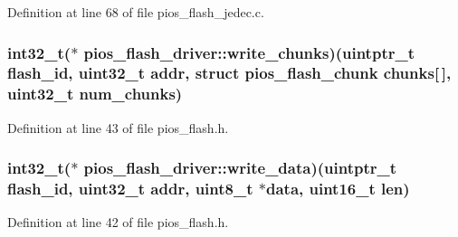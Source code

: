 \-Definition at line 68 of file pios\-\_\-flash\-\_\-jedec.\-c.

\hypertarget{group___p_i_o_s___f_l_a_s_h_ga5bac463e83aa46ce41c151c74ff8467b}{
\subsubsection[{write\-\_\-chunks}]{\setlength{\rightskip}{0pt plus 5cm}int32\-\_\-t($\ast$ {\bf pios\-\_\-flash\-\_\-driver\-::write\-\_\-chunks})(uintptr\-\_\-t flash\-\_\-id, uint32\-\_\-t addr, struct {\bf pios\-\_\-flash\-\_\-chunk} chunks\mbox{[}$\,$\mbox{]}, uint32\-\_\-t num\-\_\-chunks)}}\label{group___p_i_o_s___f_l_a_s_h_ga5bac463e83aa46ce41c151c74ff8467b}


\-Definition at line 43 of file pios\-\_\-flash.\-h.

\hypertarget{group___p_i_o_s___f_l_a_s_h_ga019d8ac125523464c1068f1170852dd0}{
\subsubsection[{write\-\_\-data}]{\setlength{\rightskip}{0pt plus 5cm}int32\-\_\-t($\ast$ {\bf pios\-\_\-flash\-\_\-driver\-::write\-\_\-data})(uintptr\-\_\-t flash\-\_\-id, uint32\-\_\-t addr, uint8\-\_\-t $\ast$data, uint16\-\_\-t len)}}\label{group___p_i_o_s___f_l_a_s_h_ga019d8ac125523464c1068f1170852dd0}


\-Definition at line 42 of file pios\-\_\-flash.\-h.

